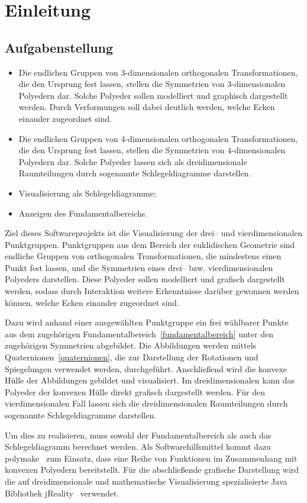 \section{Einleitung}

\subsection{Aufgabenstellung}

    \begin{itemize}
        \item Die endlichen Gruppen von 3-dimensionalen orthogonalen Transformationen, die den Ursprung fest lassen, stellen die Symmetrien von 3-dimensionalen Polyedern dar. Solche Polyeder sollen modelliert und graphisch dargestellt werden. Durch Verformungen soll dabei deutlich werden, welche Ecken einander zugeordnet sind.
        \item Die endlichen Gruppen von 4-dimensionalen orthogonalen Transformationen, die den Ursprung fest lassen, stellen die Symmetrien von 4-dimensionalen Polyedern dar. Solche Polyeder lassen sich als dreidimensionale Raumteilungen durch sogenannte Schlegeldiagramme darstellen.
        \item Visualisierung als Schlegeldiagramme;
        \item Anzeigen des Fundamentalbereichs.
    \end{itemize}
    Ziel dieses Softwareprojekts ist die Visualisierung der drei-- und vierdimensionalen Punktgruppen. Punktgruppen aus dem Bereich der euklidischen Geometrie sind endliche Gruppen von orthogonalen Transformationen, die mindestens einen Punkt fest lassen, und die Symmetrien eines drei-- bzw. vierdimensionalen Polyeders darstellen. Diese Polyeder sollen modelliert und grafisch dargestellt werden, sodass durch Interaktion weitere Erkenntnisse darüber gewonnen werden können, welche Ecken einander zugeordnet sind.
    
    Dazu wird anhand einer ausgewählten Punktgruppe ein frei wählbarer Punkte aus dem zugehörigen Fundamentalbereich~\ref{fundamentalbereich} unter den zugehörigen Symmetrien abgebildet. Die Abbildungen werden mittels Quaternionen~\ref{quaternionen}, die zur Darstellung der Rotationen und Spiegelungen verwendet werden, durchgeführt. Anschließend wird die konvexe Hülle der Abbildungen gebildet und visualisiert. Im dreidimensionalen kann das Polyeder der konvexen Hülle direkt grafisch dargestellt werden. Für den vierdimensionalen Fall lassen sich die dreidimensionalen Raumteilungen durch sogenannte Schlegeldiagramme darstellen.
    
    Um dies zu realisieren, muss sowohl der Fundamentalbereich als auch das Schlegeldiagramm berechnet werden. Als Softwarehilfsmittel kommt dazu polymake~\cite{polymake} zum Einsatz, dass eine Reihe von Funktionen im Zusammenhang mit konvexen Polyedern bereitstellt. Für die abschließende grafische Darstellung wird die auf dreidimensionale und mathematische Visualisierung spezialisierte Java Bibliothek jReality~\cite{jreality} verwendet.